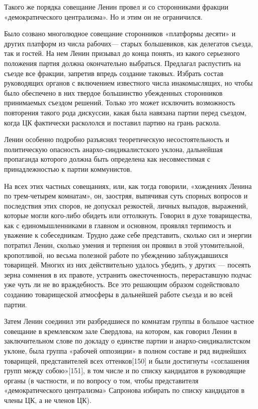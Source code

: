 \documentclass[12pt, a4paper, openany]{book}
\begin{document}
Такого же порядка совещание Ленин провел и со сторонниками фракции «демократического централизма». Но и этим он не ограничился.

Было созвано многолюдное совещание сторонников «платформы десяти» и других платформ из числа рабочих— старых большевиков, как делегатов съезда, так и гостей. На нем Ленин призывал до конца понять, из какого серьезного положения партия должна окончательно выбраться. Предлагал распустить на съезде все фракции, запретив впредь создание таковых. Избрать состав руководящих органов с включением известного числа инакомыслящих, но чтобы было обеспечено в них твердое большинство убежденных сторонников принимаемых съездом решений. Только это может исключить возможность повторения такого рода дискуссии, какая была навязана партии перед съездом, когда ЦК фактически раскололся и поставил партию на грань раскола.

Ленин особенно подробно разъяснял теоретическую несостоятельность и политическую опасность анархо-синдикалистского уклона, дальнейшая пропаганда которого должна быть определена как несовместимая с принадлежностью к партии коммунистов.

На всех этих частных совещаниях, или, как тогда говорили, «хождениях Ленина по трем-четырем комнатам», он, заостряя, выпячивая суть спорных вопросов и последствия этих споров, не допускал резкостей, личных выпадов, выражений, которые могли кого-либо обидеть или оттолкнуть. Говорил в духе товарищества, как с единомышленниками в главном и основном, проявлял терпимость и уважение к собеседникам. Трудно даже себе представить, сколько сил и энергии потратил Ленин, сколько умения и терпения он проявил в этой утомительной, кропотливой, но весьма полезной работе по убеждению заблуждавшихся товарищей. Многих из них действительно удалось убедить, у других — посеять зерна сомнения в их правоте, устранить ожесточенность, перераставшую подчас уже чуть ли не во враждебность. Все это решающим образом содействовало созданию товарищеской атмосферы в дальнейшей работе съезда и во всей партии.

Затем Ленин соединил эти разбредшиеся по комнатам группы в большое частное совещание в кремлевском зале Свердлова, на котором, как говорил Ленин в заключительном слове по докладу о единстве партии и анархо-синдикалистском уклоне, была группа «рабочей оппозиции» в полном составе и ряд виднейших товарищей, представителей всех оттенков[150] и были достигнуты «соглашения групп между собою»[151], в том числе и по списку кандидатов в руководящие органы (в частности, и по вопросу о том, чтобы представителя «демократического централизма» Сапронова избирать по списку кандидатов в члены ЦК, а не членов ЦК).
\end{document}

